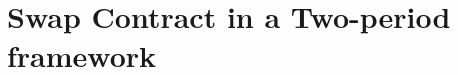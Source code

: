 \documentclass[main.tex]{subfiles}
\begin{document}
    \section{Swap Contract in a Two-period framework}

    
\end{document}
